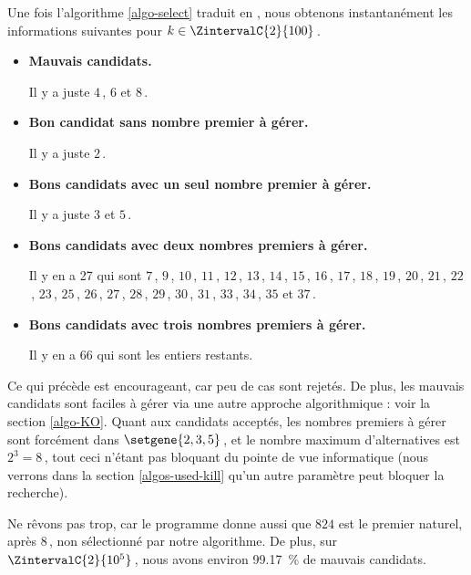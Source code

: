\medskip

Une fois l'algorithme \ref{algo-select} traduit en \python, nous obtenons instantanément les informations suivantes pour $k \in \ZintervalC{2}{100}$\,.
%
\begin{itemize}
	\item \textbf{Mauvais candidats.}
	
	\noindent
	Il y a juste $4$\,, $6$ et $8$\,.
	
	\item \textbf{Bon candidat sans nombre premier à gérer.}
	
	\noindent
	Il y a juste $2$\,.
	
	
	\item \textbf{Bons candidats avec un seul nombre premier à gérer.}
	
	\noindent
	Il y a juste $3$ et $5$\,.
	
	\item \textbf{Bons candidats avec deux nombres premiers à gérer.}
	
	\noindent
	Il y en a 27 qui sont $7$\,, $9$\,, $10$\,, $11$\,, $12$\,, $13$\,, $14$\,, $15$\,, $16$\,, $17$\,, $18$\,, $19$\,, $20$\,, $21$\,, $22$\,, $23$\,, $25$\,, $26$\,, $27$\,, $28$\,, $29$\,, $30$\,, $31$\,, $33$\,, $34$\,, $35$ et $37$\,.

	\item\textbf{Bons candidats avec trois nombres premiers à gérer.}
	
	\noindent
	Il y en a 66 qui sont les entiers restants.
\end{itemize}


Ce qui précède est encourageant, car peu de cas sont rejetés.
De plus, les mauvais candidats sont faciles à gérer via une autre approche algorithmique : voir la section \ref{algo-KO}.
Quant aux candidats acceptés, les nombres premiers à gérer sont forcément dans $\setgene{2, 3, 5}$\,, et le nombre maximum d'alternatives est $2^3 = 8$\,, tout ceci n'étant pas bloquant du pointe de vue informatique (nous verrons dans la section \ref{algos-used-kill} qu'un autre paramètre peut bloquer la recherche).
 



\begin{remark}
	Ne rêvons pas trop, car le programme donne aussi que $824$ est le premier naturel, après $8$\,, non sélectionné par notre algorithme.
	De plus, sur $\ZintervalC{2}{10^5}$\,, nous avons environ \qty{99.17}{\percent} de mauvais candidats.
\end{remark}


